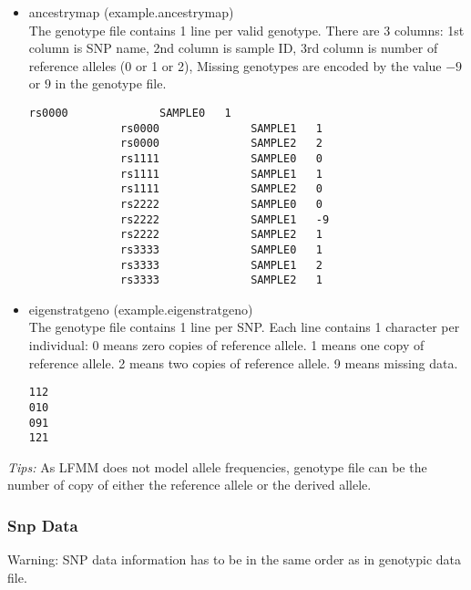 \documentclass[10pt,a4paper]{article}
\begin{document}
\begin{itemize}
\item ancestrymap (example.ancestrymap)\\
The genotype file contains 1 line per valid genotype.  There are 3 columns:
  1st column is SNP name,
  2nd column is sample ID,
  3rd column is number of reference alleles (0 or 1 or 2),
Missing genotypes are encoded by the value $-9$ or $9$ in the genotype file.
\begin{center}
\footnotesize
\begin{Verbatim}[frame=single]
              rs0000              SAMPLE0   1
              rs0000              SAMPLE1   1
              rs0000              SAMPLE2   2
              rs1111              SAMPLE0   0
              rs1111              SAMPLE1   1
              rs1111              SAMPLE2   0
              rs2222              SAMPLE0   0
              rs2222              SAMPLE1   -9
              rs2222              SAMPLE2   1
              rs3333              SAMPLE0   1
              rs3333              SAMPLE1   2
              rs3333              SAMPLE2   1
\end{Verbatim}
\end{center}

\item eigenstratgeno (example.eigenstratgeno)\\
The genotype file contains 1 line per SNP.
  Each line contains 1 character per individual:
  0 means zero copies of reference allele.
  1 means one copy of reference allele.
  2 means two copies of reference allele.
  9 means missing data.

\begin{center}
\footnotesize
\begin{Verbatim}[frame=single]
112
010
091
121
\end{Verbatim}
\end{center}

\end{itemize}
{\it Tips:} As LFMM does not model allele frequencies, genotype file can be
the number of copy of either the reference allele or the derived allele.

\subsubsection{Snp Data}
Warning: SNP data information has to be in the same order as in genotypic data file.
\end{document}
